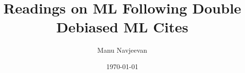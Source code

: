 \documentclass[10pt]{article}
\title{Readings on ML Following Double Debiased ML Cites}
\author{Manu Navjeevan}
\date{\today}
\theoremstyle{exampstyle}
\begin{document}
\maketitle
\tableofcontents
\newpage

\normalsize

\newpage

\newpage

\newpage

\end{document}
